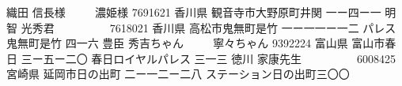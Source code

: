 \documentclass[]{jletteraddress}
\begin{document}
\addaddress
     {織田 信長}{様}
     {　　 濃姫}{様}
     {7691621}
     {香川県 観音寺市大野原町井関 一ー四ー一 }
     {}
\addaddress
     {明智 光秀}{君}
     {　　 　　}{}
     {7618021}
     {香川県 高松市鬼無町是竹 一ー一一ー一二}
     {パレス鬼無町是竹 四一六}
\addaddress
     {豊臣 秀吉}{ちゃん}
     {　　 寧々}{ちゃん}
     {9392224}
     {富山県 富山市春日 三ー五ー二〇}
     {春日ロイヤルパレス 三一三}
\addaddress
     {徳川 家康}{先生}
     {　　 　　}{}
     {6008425}
     {宮崎県 延岡市日の出町 二ー一二ー二八}
     {ステーション日の出町三〇〇}
\end{document}
